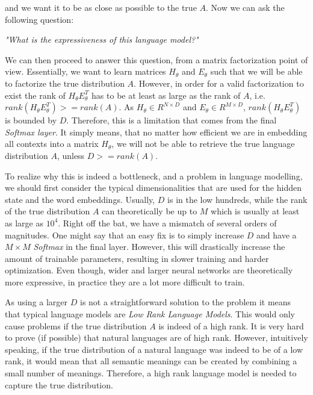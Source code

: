 and we want it to be as close as possible to the true $ A $. Now we can ask the following question:

\begin{center}
    \emph{"What is the expressiveness of this language model?"}
\end{center}

We can then proceed to answer this question, from a matrix factorization point of view. Essentially, we want to learn matrices $ H_\theta $ and $ E_\theta $ such that we will be able to factorize the true distribution $ A $. However, in order for a valid factorization to exist the rank of $ H_\theta E^T_\theta $ has to be at least as large as the rank of $ A $, i.e. $ rank(H_\theta E^T_\theta ) >= rank(A) $. As $ H_\theta \in R^{N \times D} $ and $ E_\theta \in R^{M \times D} $, $ rank(H_\theta E^T_\theta ) $ is bounded by $ D $. Therefore, this is a limitation that comes from the final \emph{Softmax layer}. It simply means, that no matter how efficient we are in embedding all contexts into a matrix $ H_\theta $, we will not be able to retrieve the true language distribution $ A $, unless $ D >= rank(A) $.

To realize why this is indeed a bottleneck, and a problem in language modelling, we should first consider the typical dimensionalities that are used for the hidden state and the word embeddings. Usually, $ D $ is in the low hundreds, while the rank of the true distribution $ A $ can theoretically be up to $ M $ which is usually at least as large as $ 10^4 $. Right off the bat, we have a mismatch of several orders of magnitudes. One might say that an easy fix is to simply increase $ D $ and have a $ M \times M $ \emph{Softmax} in the final layer. However, this will drastically increase the amount of trainable parameters, resulting in slower training and harder optimization. Even though, wider and larger neural networks are theoretically more expressive, in practice they are a lot more difficult to train.

As using a larger $ D $ is not a straightforward solution to the problem it means that typical language models are \emph{Low Rank Language Models}. This would only cause problems if the true distribution $ A $ is indeed of a high rank. It is very hard to prove (if possible) that natural languages are of high rank. However, intuitively speaking, if the true distribution of a natural language was indeed to be of a low rank, it would mean that all semantic meanings can be created by combining a small number of meanings. Therefore, a high rank language model is needed to capture the true distribution.

